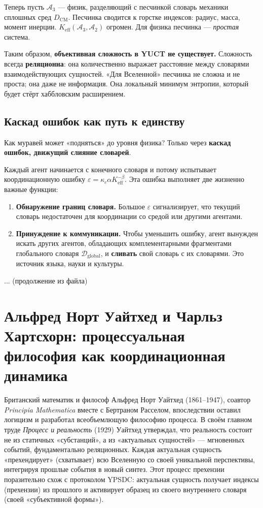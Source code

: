 \documentclass[12pt,a4paper]{article}
\begin{document}
	Теперь пусть \(\mathcal{A}_3\) — физик, разделяющий с песчинкой словарь механики сплошных сред \(D_{\text{CM}}\). Песчинка сводится к горстке индексов: радиус, масса, момент инерции. \(K_{\mathrm{eff}}(\mathcal{A}_3, \mathcal{A}_2)\) огромен. Для физика песчинка — \emph{простая} система.
	
	Таким образом, \textbf{объективная сложность в YUCT не существует.} Сложность всегда \textbf{реляционна}: она количественно выражает расстояние между словарями взаимодействующих сущностей. «Для Вселенной» песчинка не сложна и не проста; она даже не информация. Она локальный минимум энтропии, который будет стёрт хаббловским расширением.
	
	\subsection{Каскад ошибок как путь к единству}
	\label{subsec:cascade}
	
	Как муравей может «подняться» до уровня физика? Только через \textbf{каскад ошибок, движущий слияние словарей}.
	
	Каждый агент начинается с конечного словаря и потому испытывает координационную ошибку \(\varepsilon = \kappa_c \alpha K_{\mathrm{eff}}^{-\beta}\). Эта ошибка выполняет две жизненно важные функции:
	
	\begin{enumerate}[leftmargin=*]
		\item \textbf{Обнаружение границ словаря.} Большое \(\varepsilon\) сигнализирует, что текущий словарь недостаточен для координации со средой или другими агентами.
		\item \textbf{Принуждение к коммуникации.} Чтобы уменьшить ошибку, агент вынужден искать других агентов, обладающих комплементарными фрагментами глобального словаря \(\mathcal{D}_{\text{global}}\), и \textbf{сливать} свой словарь с их словарями. Это источник языка, науки и культуры.
	\end{enumerate}
	
	... (продолжение из файла)
	
	\section{Альфред Норт Уайтхед и Чарльз Хартсхорн: процессуальная философия как координационная динамика}
	
	Британский математик и философ Альфред Норт Уайтхед (1861–1947), соавтор \emph{Principia Mathematica} вместе с Бертраном Расселом, впоследствии оставил логицизм и разработал всеобъемлющую философию процесса. В своём главном труде \emph{Процесс и реальность} (1929) Уайтхед утверждал, что реальность состоит не из статичных «субстанций», а из «актуальных сущностей» — мгновенных событий, фундаментально реляционных. Каждая актуальная сущность «прехендирует» (схватывает) всю Вселенную со своей уникальной перспективы, интегрируя прошлые события в новый синтез. Этот процесс прехензии поразительно схож с протоколом YPSDC: актуальная сущность получает индексы (прехензии) из прошлого и активирует образец из своего внутреннего словаря (своей «субъективной формы»).
	
\end{document}

